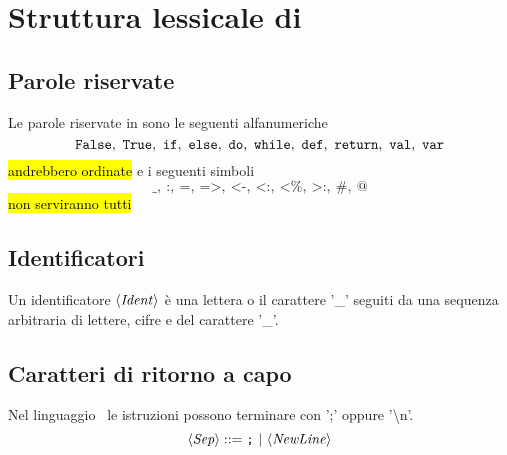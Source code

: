 \section{Struttura lessicale di \SBF}

\subsection*{Parole riservate}
Le parole riservate in \SBF sono le seguenti alfanumeriche
\begin{equation}
\False,\ \True,\ \If,\ \Else,\ \Do,\ \While,\ \Def,\ \Return,\ \Val,\ \Var
\end{equation}
\hl{andrebbero ordinate}
e i seguenti simboli
\begin{equation}
\texttt{\_},\ \texttt{:},\ \texttt{=},\ \texttt{=>},\ \texttt{<-},\ \texttt{<:},\ \texttt{<\%},\ \texttt{>:},\ \texttt{\#},\ \texttt{@}
\end{equation}
\hl{non serviranno tutti}

\subsection*{Identificatori}

Un identificatore $\langle \mathit{Ident} \rangle$ è una lettera o il carattere '\_' seguiti da una sequenza arbitraria di lettere, cifre e del carattere '\_'.

\subsection*{Caratteri di ritorno a capo}
Nel linguaggio \SBF\ le istruzioni possono terminare con ';' oppure '\textbackslash n'. 
\begin{equation*}
\token{Sep} ::= \texttt{;}\ |\ \token{NewLine}
\end{equation*}

